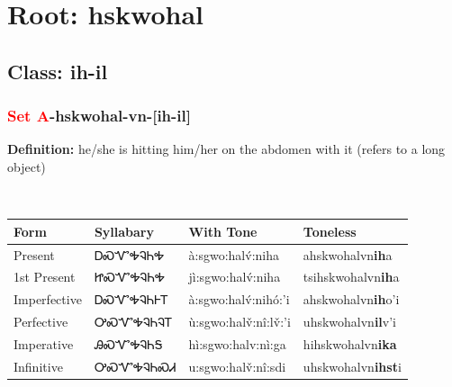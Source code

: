 \needspace{4in}
\section*{Root: hskwohal}
\nopagebreak
{}
\needspace{3in}
\subsection*{Class: ih-il}
\nopagebreak
\needspace{2in}
\subsubsection*{\textcolor{Red}{Set A}{-}\textbf{hskwohal}{-}vn{-}[ih-il]}
\nopagebreak
\textbf{Definition: } he/she is hitting him/her on the abdomen with it (refers to a long object)
\\[0.5em]
\begin{tabularx}{\textwidth}{l X X X}%
\toprule%
\textbf{Form}&\textbf{Syllabary}&\textbf{With Tone}&\textbf{Toneless}\\%
\midrule%
Present&ᎠᏍᏉᎭᎸᏂᎭ&à:sgwo:halv́:niha&ahskwohalvn\textbf{ih}a\\%
1st Present&ᏥᏍᏉᎭᎸᏂᎭ&jì:sgwo:halv́:niha&tsihskwohalvn\textbf{ih}a\\%
Imperfective&ᎠᏍᏉᎭᎸᏂᎰᎢ&à:sgwo:halv́:nihó:’i&ahskwohalvn\textbf{ih}o'i\\%
Perfective&ᎤᏍᏉᎭᎸᏂᎸᎢ&ù:sgwo:halv̌:nî:lv̌:’i&uhskwohalvn\textbf{il}v'i\\%
Imperative&ᎯᏍᏉᎭᎸᏂᎦ&hì:sgwo:halv:nì:ga&hihskwohalvn\textbf{ika}\\%
Infinitive&ᎤᏍᏉᎭᎸᏂᏍᏗ&u:sgwo:halv̌:nî:sdi&uhskwohalvn\textbf{ihst}i\\%
\bottomrule%
\end{tabularx}
\\[1em]